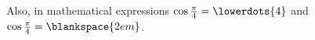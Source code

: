 Also, in mathematical expressions
$\cos\frac\pi4 = \lowerdots{4}$
and $\cos\frac\pi4 = \blankspace{2em}$.
